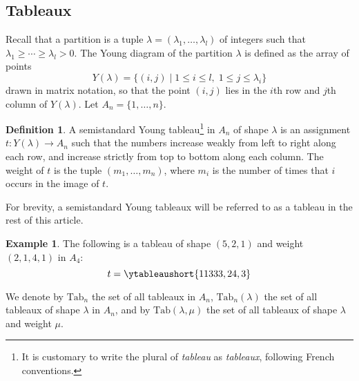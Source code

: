 \documentclass[12pt]{amsart}
\theoremstyle{definition}
\newtheorem{definition}[theorem]{Definition}
\newtheorem{example}[theorem]{Example}
\newcommand{\Tab}{\mathrm{Tab}}
\begin{document}
\subsection{Tableaux}
\label{sec:tableaux}
Recall that a partition is a tuple $\lambda=(\lambda_1,\dotsc,\lambda_l)$ of integers such that $\lambda_1\geq \dotsb\geq \lambda_l>0$.
The Young diagram of the partition $\lambda$ is defined as the array of points
\begin{displaymath}
Y(\lambda)=\{(i,j)\mid 1\leq i\leq l,\;1\leq j\leq \lambda_i\}
\end{displaymath}
drawn in matrix notation, so that the point $(i,j)$ lies in the $i$th row and $j$th column of $Y(\lambda)$.
Let $A_n=\{1,\dotsc,n\}$.
\begin{definition}
  A semistandard Young tableau\footnote{It is customary to write the plural of \emph{tableau} as \emph{tableaux}, following French conventions.} in $A_n$ of shape $\lambda$ is an assignment $t:Y(\lambda)\to A_n$ such that the numbers increase weakly from left to right along each row, and increase strictly from top to bottom along each column.
  The weight of $t$ is the tuple $(m_1,\dotsc, m_n)$, where $m_i$ is the number of times that $i$ occurs in the image of $t$.
\end{definition}
For brevity, a semistandard Young tableaux will be referred to as a tableau in the rest of this article.
\begin{example}
  \label{example:ssyt}
  The following is a tableau of shape $(5,2,1)$ and weight $(2,1,4,1)$ in $A_4$:
  \begin{displaymath}
    t=\ytableaushort{11333,24,3}
  \end{displaymath}
\end{example}
We denote by $\Tab_n$ the set of all tableaux in $A_n$, $\Tab_n(\lambda)$ the set of all tableaux of shape $\lambda$ in $A_n$, and by $\Tab(\lambda,\mu)$ the set of all tableaux of shape $\lambda$ and weight $\mu$.
\end{document}
